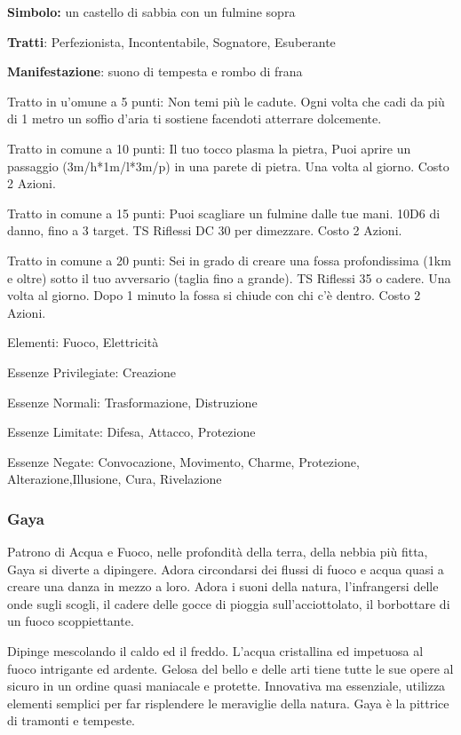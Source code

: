 \documentclass[a4paper,11pt,twoside,openany]{book}
\begin{document}
\textbf{Simbolo:} un castello di sabbia con un fulmine sopra

\textbf{Tratti}: Perfezionista, Incontentabile, Sognatore, Esuberante

\textbf{Manifestazione}: suono di tempesta e rombo di frana

\bigskip

Tratto in u'omune a 5 punti: Non temi più le cadute. Ogni volta che cadi da più di 1 metro un soffio d'aria ti sostiene facendoti atterrare dolcemente.

Tratto in comune a 10 punti: Il tuo tocco plasma la pietra, Puoi aprire un passaggio (3m/h{*}1m/l{*}3m/p) in una parete di pietra. Una volta al giorno. Costo 2 Azioni.

Tratto in comune a 15 punti: Puoi scagliare un fulmine dalle tue mani. 10D6 di danno, fino a 3 target. TS Riflessi DC 30 per dimezzare. Costo 2 Azioni.

Tratto in comune a 20 punti: Sei in grado di creare una fossa profondissima (1km e oltre) sotto il tuo avversario (taglia fino a grande). TS Riflessi 35 o cadere. Una volta al giorno. Dopo 1 minuto la fossa si chiude con chi c'è dentro. Costo 2 Azioni.

\bigskip

Elementi: Fuoco, Elettricità

\bigskip

Essenze Privilegiate: Creazione

Essenze Normali: Trasformazione, Distruzione

Essenze Limitate: Difesa, Attacco, Protezione

Essenze Negate: Convocazione, Movimento, Charme, Protezione, Alterazione,Illusione, Cura, Rivelazione

\subsubsection{Gaya}

\label{gaya}

Patrono di Acqua e Fuoco, nelle profondità della terra, della nebbia più fitta, Gaya si diverte a dipingere. Adora circondarsi dei flussi di fuoco e acqua quasi a creare una danza in mezzo a loro. Adora i suoni della natura, l'infrangersi delle onde sugli scogli, il cadere delle gocce di pioggia sull'acciottolato, il borbottare di un fuoco scoppiettante.

Dipinge mescolando il caldo ed il freddo. L'acqua cristallina ed impetuosa al fuoco intrigante ed ardente. Gelosa del bello e delle arti tiene tutte le sue opere al sicuro in un ordine quasi maniacale e protette. Innovativa ma essenziale, utilizza elementi semplici per far risplendere le meraviglie della natura. Gaya è la pittrice di tramonti e tempeste.
\end{document}
